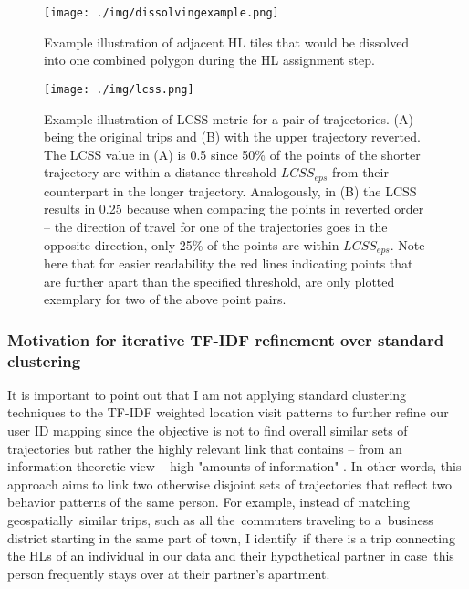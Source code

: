 \begin{figure}[H]
    \centering
    \texttt{[image: ./img/dissolvingexample.png]}
    \caption{Example illustration of adjacent HL tiles that would be dissolved into one combined polygon during the HL assignment step.}
    \label{Figure:dissolvingexample}
\end{figure}

\begin{figure}[H]
    \centering
    \texttt{[image: ./img/lcss.png]}
    \caption{Example illustration of LCSS metric for a pair of trajectories. (A) being the original trips and (B) with the upper trajectory reverted. The LCSS value in (A) is 0.5 since 50\% of the points of the shorter trajectory are within a distance threshold $LCSS_{eps}$ from their counterpart in the longer trajectory. Analogously, in (B) the LCSS results in 0.25 because when comparing the points in reverted order -- the direction of travel for one of the trajectories goes in the opposite direction, only 25\% of the points are within $LCSS_{eps}$. Note here that for easier readability the red lines indicating points that are further apart than the specified threshold, are only plotted exemplary for two of the above point pairs.}
    \label{Figure:lcss}
\end{figure}

\subsubsection{Motivation for iterative TF-IDF refinement over standard clustering}\label{appendix:motivation_tfidf}

It is important to point out that I am not applying standard clustering techniques to the TF-IDF weighted location visit patterns to further refine our user ID mapping since the objective is not to find overall similar sets of trajectories but rather the highly relevant link that contains -- from an information-theoretic view -- high "amounts of information" \citep{aizawaInformationtheoreticPerspectiveTf2003}. In other words, this approach aims to link two otherwise disjoint sets of trajectories that reflect two behavior patterns of the same person. For example, instead of matching geospatially similar trips, such as all the commuters traveling to a business district starting in the same part of town, I identify if there is a trip connecting the HLs of an individual in our data and their hypothetical partner in case this person frequently stays over at their partner's apartment.

